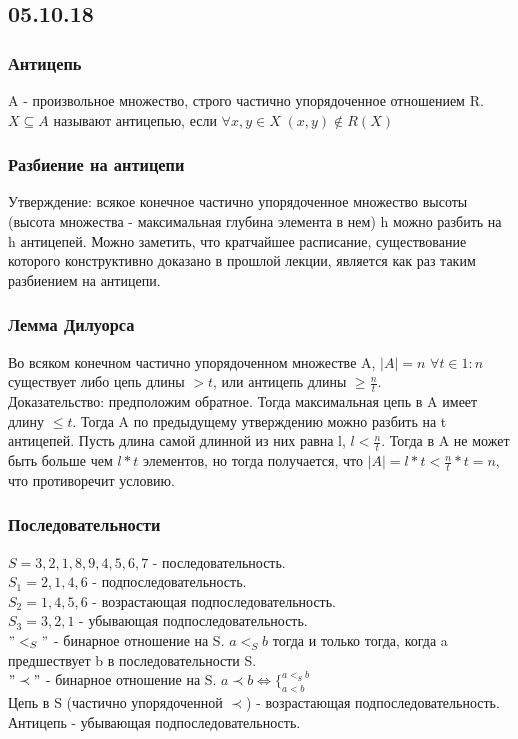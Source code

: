 \subsection{05.10.18}
\subsubsection{Антицепь}
A - произвольное множество, строго частично упорядоченное отношением R. $X \subseteq A$ называют антицепью, если $\forall x, y \in X \; (x, y) \not\in R(X)$
\subsubsection{Разбиение на антицепи}
Утверждение: всякое конечное частично упорядоченное множество высоты (высота множества - максимальная глубина элемента в нем) h можно разбить на h антицепей. Можно заметить, что кратчайшее расписание, существование которого конструктивно доказано в прошлой лекции, является как раз таким разбиением на антицепи.
\subsubsection{Лемма Дилуорса}
Во всяком конечном частично упорядоченном множестве A, $|A| = n$ $\forall t \in 1:n$ существует либо цепь длины $> t$, или антицепь длины $\geq \frac{n}{t}$. \\
Доказательство: предположим обратное. Тогда максимальная цепь в A имеет длину $\leq t$. Тогда A по предыдущему утверждению можно разбить на t антицепей. Пусть длина самой длинной из них равна l, $l < \frac{n}{t}$. Тогда в A не может быть больше чем $l * t$ элементов, но тогда получается, что $|A| = l * t < \frac{n}{t} * t = n$, что противоречит условию.
\subsubsection{Последовательности}
$S = 3, 2, 1, 8, 9, 4, 5, 6, 7$ - последовательность.\\
$S_1 = 2, 1, 4, 6$ - подпоследовательность.\\
$S_2 = 1, 4, 5, 6$ - возрастающая подпоследовательность.\\
$S_3 = 3, 2, 1$ - убывающая подпоследовательность.\\
$"<_S"$ - бинарное отношение на S. $a <_S b$ тогда и только тогда, когда a предшествует b в последовательности S.\\
$"\prec"$ - бинарное отношение на S. $a \prec b \Leftrightarrow \{_{a < b}^{a <_S b}$\\
Цепь в S (частично упорядоченной $\prec$) - возрастающая подпоследовательность. Антицепь - убывающая подпоследовательность.
